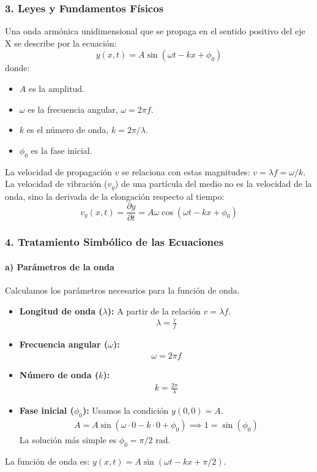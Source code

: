 \subsubsection*{3. Leyes y Fundamentos Físicos}
Una onda armónica unidimensional que se propaga en el sentido positivo del eje X se describe por la ecuación:
$$ y(x,t) = A \sin(\omega t - kx + \phi_0) $$
donde:
\begin{itemize}
    \item $A$ es la amplitud.
    \item $\omega$ es la frecuencia angular, $\omega = 2\pi f$.
    \item $k$ es el número de onda, $k = 2\pi / \lambda$.
    \item $\phi_0$ es la fase inicial.
\end{itemize}
La velocidad de propagación $v$ se relaciona con estas magnitudes: $v = \lambda f = \omega / k$.
La velocidad de vibración ($v_y$) de una partícula del medio no es la velocidad de la onda, sino la derivada de la elongación respecto al tiempo:
$$ v_y(x,t) = \frac{\partial y}{\partial t} = A\omega \cos(\omega t - kx + \phi_0) $$

\subsubsection*{4. Tratamiento Simbólico de las Ecuaciones}
\paragraph*{a) Parámetros de la onda}
Calculamos los parámetros necesarios para la función de onda.
\begin{itemize}
    \item \textbf{Longitud de onda ($\lambda$):} A partir de la relación $v = \lambda f$.
        \begin{gather} \lambda = \frac{v}{f} \end{gather}
    \item \textbf{Frecuencia angular ($\omega$):}
        \begin{gather} \omega = 2\pi f \end{gather}
    \item \textbf{Número de onda ($k$):}
        \begin{gather} k = \frac{2\pi}{\lambda} \end{gather}
    \item \textbf{Fase inicial ($\phi_0$):} Usamos la condición $y(0,0)=A$.
        \begin{gather}
            A = A \sin(\omega \cdot 0 - k \cdot 0 + \phi_0) \implies 1 = \sin(\phi_0)
        \end{gather}
        La solución más simple es $\phi_0 = \pi/2$ rad.
\end{itemize}
La función de onda es: $y(x,t) = A \sin(\omega t - kx + \pi/2)$.

